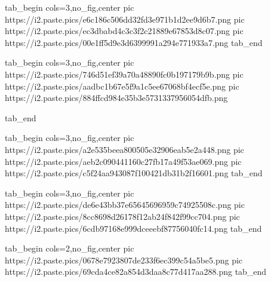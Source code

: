  
 
 
 
 
\zzSecCmtScr


\ifcmt
  tab_begin cols=3,no_fig,center
     pic https://i2.paste.pics/e6c186c506dd32fd3e971b1d2ee9d6b7.png
     pic https://i2.paste.pics/ec3dbabd4c3c3f2c21889e67853d8c07.png
     pic https://i2.paste.pics/00e1ff5d9e3d6399991a294e771933a7.png
  tab_end
\fi

\ifcmt
  tab_begin cols=3,no_fig,center
	pic https://i2.paste.pics/746d51ef39a70a48890fc0b197179b9b.png
	pic https://i2.paste.pics/aadbc1b67e5f9a1c5ee67068bf4ecf5e.png
	pic https://i2.paste.pics/884ffcd984e35b3e5731337956054dfb.png

  tab_end
\fi

\ifcmt
  tab_begin cols=3,no_fig,center
		pic https://i2.paste.pics/a2e535beea800505e32906eab5e2a448.png
		pic https://i2.paste.pics/aeb2c090441160c27fb17a49f53ae069.png
		pic https://i2.paste.pics/c5f24aa943087f100421db31b2f16601.png
  tab_end
\fi

\ifcmt
  tab_begin cols=3,no_fig,center
		pic https://i2.paste.pics/de6e43bb37e65645696959c74925508c.png
		pic https://i2.paste.pics/8cc8698d26178f12ab24f842f99cc704.png
		pic https://i2.paste.pics/6cdb97168e999dceeebf87756040fc14.png
  tab_end
\fi

\ifcmt
  tab_begin cols=2,no_fig,center
		pic https://i2.paste.pics/0678e7923807de233f6ec399c54a5be5.png
		pic https://i2.paste.pics/69cda4ce82a854d3daa8c77d417aa288.png
  tab_end
\fi
